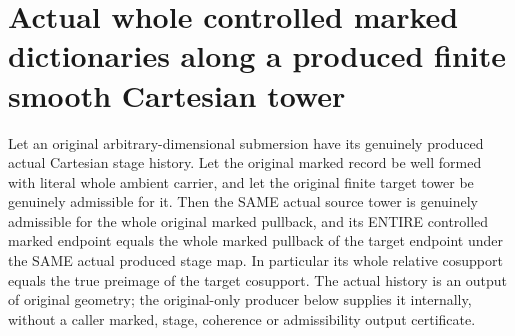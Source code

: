 \section{Actual whole controlled marked dictionaries along a produced finite smooth Cartesian tower}

\begin{theorem}
\label{hir:submersion-marked-cartesian-tower-joint-induction}
\leanok
{}
Let an original arbitrary-dimensional submersion have its genuinely
produced actual Cartesian stage history. Let the original marked record be
well formed with literal whole ambient carrier, and let the original finite
target tower be genuinely admissible for it. Then the SAME actual source
tower is genuinely admissible for the whole original marked pullback, and
its ENTIRE controlled marked endpoint equals the whole marked pullback of
the target endpoint under the SAME actual produced stage map. In particular
its whole relative cosupport equals the true preimage of the target
cosupport. The actual history is an output of original geometry; the
original-only producer below supplies it internally, without a caller
marked, stage, coherence or admissibility output certificate.
\end{theorem}
